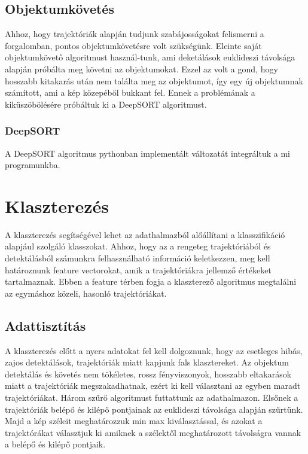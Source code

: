 \documentclass[acmtog, authorversion]{acmart}
\begin{document}
\subsection{Objektumkövetés}
Ahhoz, hogy trajektóriák alapján tudjunk szabájosságokat felismerni a forgalomban, pontos objektumkövetésre volt szükségünk. Eleinte
saját objektumkövető algoritmust használ-tunk, ami deketálások euklideszi távolsága alapján próbálta meg követni az objektumokat.
Ezzel az volt a gond, hogy hosszabb kitakarás után nem találta meg az objektumot, így egy új objektumnak számított, ami a kép
közepéből bukkant fel. Ennek a problémának a kiküszöbölésére próbáltuk ki a DeepSORT algoritmust.
\subsubsection{DeepSORT}
A DeepSORT algoritmus pythonban implementált változatát integráltuk a mi programunkba.

\section{Klaszterezés}
A klaszterezés segítségével lehet az adathalmazból alőállítani a klasszifikáció alapjául szolgáló klasszokat. Ahhoz, hogy az
a rengeteg trajektóriából és detektálásból számunkra felhasználható információ keletkezzen, meg kell határoznunk feature
vectorokat, amik a trajektóriákra jellemző értékeket tartalmaznak. Ebben a feature térben fogja a klaszterező algoritmus
megtalálni az egymáshoz közeli, hasonló trajektóriákat.
\subsection{Adattisztítás}
A klaszterezés előtt a nyers adatokat fel kell dolgoznunk, hogy az esetleges hibás, zajos detektálások, trajektóriák miatt
kapjunk fals klasztereket. Az objektum detektálás és követés nem tökéletes, rossz fényviszonyok, hosszabb eltakarások miatt 
a trajektóriák megszakadhatnak, ezért ki kell választani az egyben maradt trajektóriákat. Három szűrő algoritmust futtattunk 
az adathalmazon. Elsőnek a trajektóriák belépő és kilépő pontjainak az euklideszi távolsága alapján szűrtünk.
Majd a kép széleit meghatározzuk min max kiválasztással, és azokat a trajektórákat választjuk ki amiknek a szélektől meghatározott
távolságra vannak a belépő és kilépő pontjaik.
\end{document}
